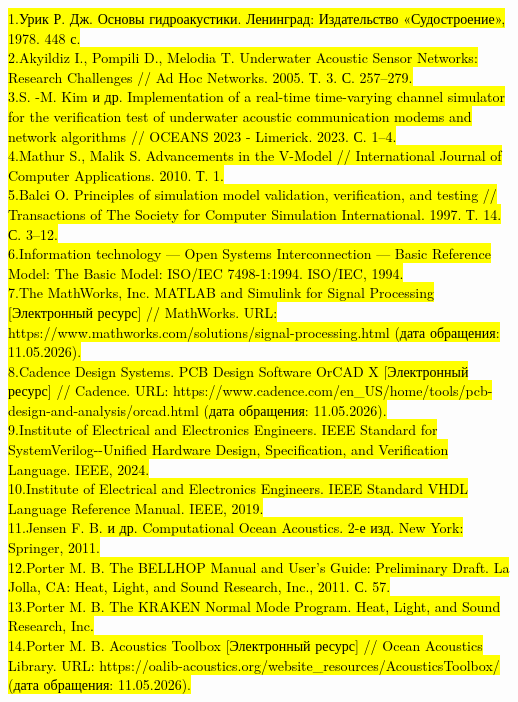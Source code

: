 \hl{1.Урик Р. Дж. Основы гидроакустики. Ленинград: Издательство
«Судостроение», 1978. 448 с.\\
2.Akyildiz I., Pompili D., Melodia T. Underwater Acoustic Sensor
Networks: Research Challenges // Ad Hoc Networks. 2005. Т. 3. С.
257--279.\\
3.S. -M. Kim и др. Implementation of a real-time time-varying channel
simulator for the verification test of underwater acoustic communication
modems and network algorithms // OCEANS 2023 - Limerick. 2023. С.
1--4.\\
4.Mathur S., Malik S. Advancements in the V-Model // International
Journal of Computer Applications. 2010. Т. 1.\\
5.Balci O. Principles of simulation model validation, verification, and
testing // Transactions of The Society for Computer Simulation
International. 1997. Т. 14. С. 3--12.\\
6.Information technology --- Open Systems Interconnection --- Basic
Reference Model: The Basic Model: ISO/IEC 7498-1:1994. ISO/IEC, 1994.\\
7.The MathWorks, Inc. MATLAB and Simulink for Signal Processing
{[}Электронный ресурс{]} // MathWorks. URL:
https://www.mathworks.com/solutions/signal-processing.html (дата
обращения: 11.05.2026).\\
8.Cadence Design Systems. PCB Design Software \textbar{} OrCAD X
{[}Электронный ресурс{]} // Cadence. URL:
https://www.cadence.com/en\_US/home/tools/pcb-design-and-analysis/orcad.html
(дата обращения: 11.05.2026).\\
9.Institute of Electrical and Electronics Engineers. IEEE Standard for
SystemVerilog-\/-Unified Hardware Design, Specification, and
Verification Language. IEEE, 2024.\\
10.Institute of Electrical and Electronics Engineers. IEEE Standard VHDL
Language Reference Manual. IEEE, 2019.\\
11.Jensen F. B. и др. Computational Ocean Acoustics. 2-е изд. New York:
Springer, 2011.\\
12.Porter M. B. The BELLHOP Manual and User's Guide: Preliminary Draft.
La Jolla, CA: Heat, Light, and Sound Research, Inc., 2011. С. 57.\\
13.Porter M. B. The KRAKEN Normal Mode Program. Heat, Light, and Sound
Research, Inc.\\
14.Porter M. B. Acoustics Toolbox {[}Электронный ресурс{]} // Ocean
Acoustics Library. URL:
https://oalib-acoustics.org/website\_resources/AcousticsToolbox/ (дата
обращения: 11.05.2026).\\
}
